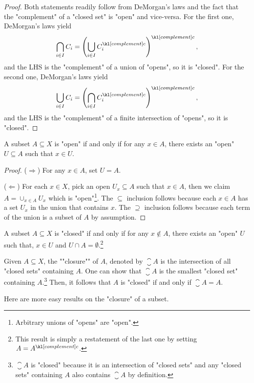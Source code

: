 \documentclass[main.tex]{subfiles}
\begin{document}
\begin{proof}
	Both statements readily follow from DeMorgan's laws and the fact that the "complement" of a "closed set" is "open" and vice-versa. For the first one, DeMorgan's laws yield
	\[\bigcap_{i \in I} C_i =  \left( \bigcup_{i \in I} C_i^\comple \right)^\comple,\]
	and the LHS is the "complement" of a union of "opens", so it is "closed". For the second one, DeMorgan's laws yield
	\[\bigcup_{i \in I} C_i =  \left( \bigcap_{i \in I} C_i^\comple \right)^\comple,\]
	and the LHS is the "complement" of a finite intersection of "opens", so it is "closed".
\end{proof}
\begin{prop}\label{prop:openchar}
	A subset $A \subseteq X$ is "open" if and only if for any $x \in A$, there exists an "open" $U \subseteq A$ such that $x \in U$.
\end{prop}
\begin{proof}
	($\Rightarrow$) For any $x \in A$, set $U = A$.
	
	($\Leftarrow$) For each $x \in X$, pick an open $U_x \subseteq A$ such that $x \in A$, then we claim $A = \cup_{x \in A} U_x$ which is "open"\footnote{Arbitrary unions of "opens" are "open".}. The $\subseteq$ inclusion follows because each $x \in A$ has a set $U_x$ in the union that contains $x$. The $\supseteq$ inclusion follows because each term of the union is a subset of $A$ by assumption.
\end{proof}
\begin{prop}\label{prop:closedchar}
	A subset $A\subseteq X$ is "closed" if and only if for any $x \notin A$, there exists an "open" $U$ such that, $x \in U$ and $U\cap A = \emptyset$.\footnote{This result is simply a restatement of the last one by setting $A = A^\comple$.}
\end{prop}
\begin{defn}%
	\AP Given $A \subseteq X$, the ""closure"" of $A$, denoted by $\closure{A}$ is the intersection of all "closed sets" containing $A$. One can show that $\closure{A}$ is the smallest "closed set" containing $A$.\footnote{$\closure{A}$ is "closed" because it is an intersection of "closed sets" and any "closed sets" containing $A$ also contains $\closure{A}$ by definition.} Then, it follows that $A$ is "closed" if and only if $\closure{A} = A$.
\end{defn}
Here are more easy results on the "closure" of a subset.
\end{document}
